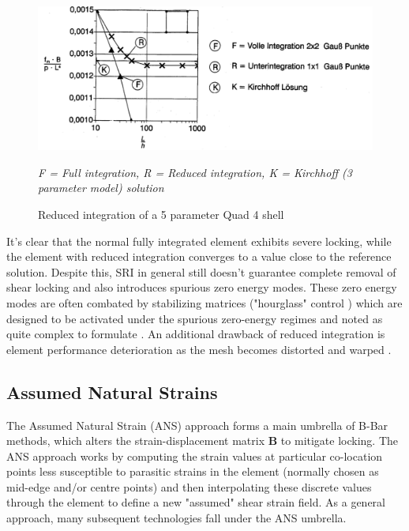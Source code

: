 \begin{figure}[H]
	\centering
	\def\svgwidth{\columnwidth}
	\includegraphics[width=14cm]{images/shearlockingredint.png}
	\caption{Reduced integration of a 5 parameter Quad 4 shell \cite{Bletz16}}
	\begin{flushleft}
	{\scriptsize \textit{F = Full integration, R = Reduced integration, K = Kirchhoff (3 parameter model) solution}}
\end{flushleft}	
	\label{shearlockingredint}
\end{figure}

It's clear that the normal fully integrated element exhibits severe locking, while the element with reduced integration converges to a value close to the reference solution. Despite this, SRI in general still doesn't guarantee complete removal of shear locking and also introduces spurious zero energy modes. These zero energy modes are often combated by stabilizing matrices ("hourglass" control \cite{Zien2Vol2000}) which are designed to be activated under the spurious zero-energy regimes and noted as quite complex to formulate \cite{Mohan97}. An additional drawback of reduced integration is element performance deterioration as the mesh becomes distorted and warped \cite{Nguyen2009} \cite{Yang2000}.

\subsection{Assumed Natural Strains}

The Assumed Natural Strain (ANS) approach forms a main umbrella of B-Bar methods, which alters the strain-displacement matrix $\mathbf{B}$ to mitigate locking. The ANS approach \cite{MACNEAL1982} works by computing the strain values at particular co-location points less susceptible to parasitic strains in the element (normally chosen as mid-edge and/or centre points) and then interpolating these discrete values through the element to define a new "assumed" shear strain field. As a general approach, many subsequent technologies fall under the ANS umbrella.

